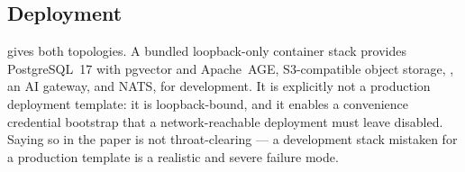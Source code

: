 \subsection{Deployment}

 gives both topologies. A bundled loopback-only container
stack provides PostgreSQL~17 with pgvector and Apache~AGE, S3-compatible object
storage, \mlflow{}, an AI gateway, and NATS, for development. It is explicitly not
a production deployment template: it is loopback-bound, and it enables a
convenience credential bootstrap that a network-reachable deployment must leave
disabled. Saying so in the paper is not throat-clearing --- a development stack
mistaken for a production template is a realistic and severe failure mode.
